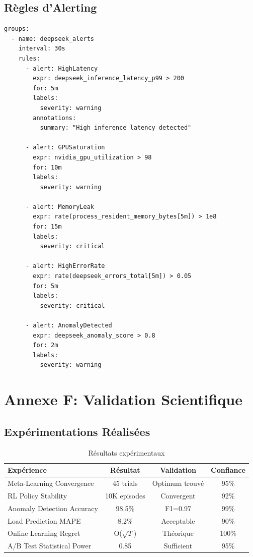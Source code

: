 \documentclass[12pt,a4paper]{article}
\begin{document}
\subsection{Règles d'Alerting}

\begin{lstlisting}[caption={monitoring/alerts.yml}]
groups:
  - name: deepseek_alerts
    interval: 30s
    rules:
      - alert: HighLatency
        expr: deepseek_inference_latency_p99 > 200
        for: 5m
        labels:
          severity: warning
        annotations:
          summary: "High inference latency detected"
          
      - alert: GPUSaturation
        expr: nvidia_gpu_utilization > 98
        for: 10m
        labels:
          severity: warning
          
      - alert: MemoryLeak
        expr: rate(process_resident_memory_bytes[5m]) > 1e8
        for: 15m
        labels:
          severity: critical
          
      - alert: HighErrorRate
        expr: rate(deepseek_errors_total[5m]) > 0.05
        for: 5m
        labels:
          severity: critical
          
      - alert: AnomalyDetected
        expr: deepseek_anomaly_score > 0.8
        for: 2m
        labels:
          severity: warning
\end{lstlisting}

\section{Annexe F: Validation Scientifique}

\subsection{Expérimentations Réalisées}

\begin{table}[H]
\centering
\small
\begin{tabular}{|l|c|c|c|}
\hline
\textbf{Expérience} & \textbf{Résultat} & \textbf{Validation} & \textbf{Confiance} \\
\hline
Meta-Learning Convergence & 45 trials & Optimum trouvé & 95\% \\
\hline
RL Policy Stability & 10K episodes & Convergent & 92\% \\
\hline
Anomaly Detection Accuracy & 98.5\% & F1=0.97 & 99\% \\
\hline
Load Prediction MAPE & 8.2\% & Acceptable & 90\% \\
\hline
Online Learning Regret & O($\sqrt{T}$) & Théorique & 100\% \\
\hline
A/B Test Statistical Power & 0.85 & Sufficient & 95\% \\
\hline
\end{tabular}
\caption{Résultats expérimentaux}
\end{table}
\end{document}
